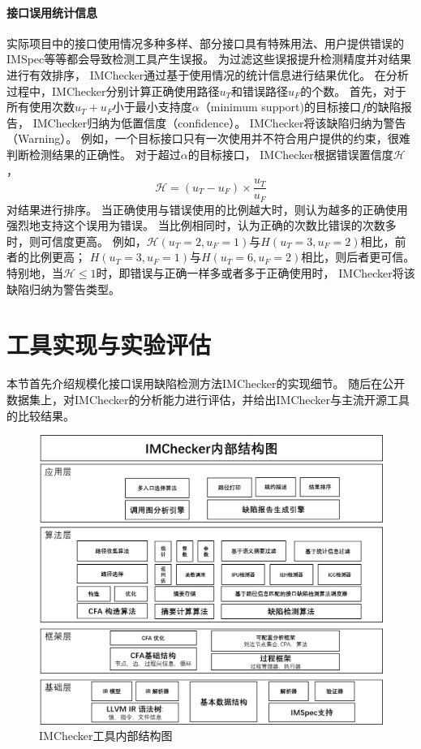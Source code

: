 \paragraph{接口误用统计信息}
实际项目中的接口使用情况多种多样、部分接口具有特殊用法、用户提供错误的IMSpec等等都会导致检测工具产生误报。
为过滤这些误报提升检测精度并对结果进行有效排序，
IMChecker通过基于使用情况的统计信息进行结果优化。
在分析过程中，IMChecker分别计算正确使用路径$u_T$和错误路径$u_F$的个数。
首先，对于所有使用次数$u_T+u_F$小于最小支持度$\alpha$（minimum support)的目标接口$f$的缺陷报告，
IMChecker归纳为低置信度（confidence）。
IMChecker将该缺陷归纳为警告（Warning）。
例如，一个目标接口只有一次使用并不符合用户提供的约束，很难判断检测结果的正确性。
对于超过$\alpha$的目标接口，
IMChecker根据错误置信度$\mathcal{H}$，
$$\mathcal{H}  = ({u_T-u_F})\times\dfrac{u_T}{u_F}$$
对结果进行排序。
当正确使用与错误使用的比例越大时，则认为越多的正确使用强烈地支持这个误用为错误。
当比例相同时，认为正确的次数比错误的次数多时，则可信度更高。
例如，$\mathcal{H}(u_T=2, u_F=1)$与$H(u_T=3, u_F=2)$相比，前者的比例更高；
$H(u_T=3, u_F=1)$与$H(u_T=6, u_F=2)$相比，则后者更可信。
特别地，当$\mathcal{H} \le 1$时，即错误与正确一样多或者多于正确使用时，
IMChecker将该缺陷归纳为警告类型。

\section{工具实现与实验评估}
\label{sec:3.4}
本节首先介绍规模化接口误用缺陷检测方法IMChecker的实现细节。
随后在公开数据集上，对IMChecker的分析能力进行评估，并给出IMChecker与主流开源工具的比较结果。

\begin{figure}[t]
	\centering
	\includegraphics[width=0.9\linewidth]{figures/cp3-implementation.png}
	\caption{
		IMChecker工具内部结构图
	}
	\label{fig:3-4-implementation}
\end{figure}


